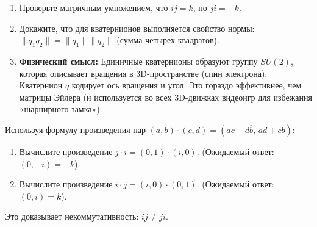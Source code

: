 \documentclass[11pt, a4paper]{extarticle}
\renewcommand{\bar}[1]{\overline{#1}}
\begin{document}
\begin{exercise}
\begin{enumerate}
    \item Проверьте матричным умножением, что $ij = k$, но $ji = -k$.
    \item Докажите, что для кватернионов выполняется свойство нормы: $\|q_1 q_2\| = \|q_1\| \|q_2\|$ (сумма четырех квадратов).
    \item \textbf{Физический смысл:} Единичные кватернионы образуют группу $SU(2)$, которая описывает вращения в 3D-пространстве (спин электрона). Кватернион $q$ кодирует ось вращения и угол. Это гораздо эффективнее, чем матрицы Эйлера (и используется во всех 3D-движках видеоигр для избежания «шарнирного замка»).
\end{enumerate}
\end{exercise}

\begin{exercise}[Рождение $k$]
    Используя формулу произведения пар $(a, b) \cdot (c, d) = (ac - d\bar{b}, \, \bar{a}d + cb)$:
    \begin{enumerate}
        \item Вычислите произведение $j \cdot i = (0, 1) \cdot (i, 0)$.
        (Ожидаемый ответ: $(0, -i) = -k$).
        \item Вычислите произведение $i \cdot j = (i, 0) \cdot (0, 1)$.
        (Ожидаемый ответ: $(0, i) = k$).
    \end{enumerate}
    Это доказывает некоммутативность: $ij \neq ji$.
    \end{exercise}
\end{document}

